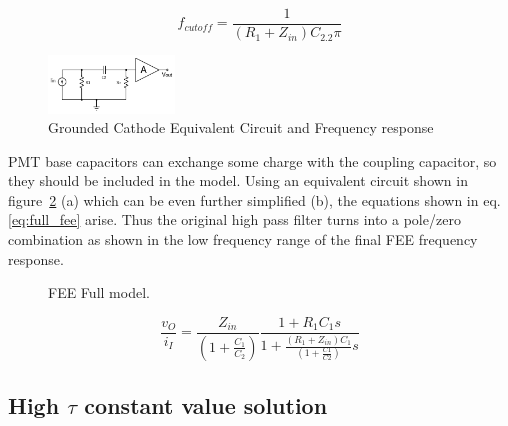 \documentclass[a4paper, 10pt, oneside, twocolumn, 3p]{elsarticle}
\begin{document}
\begin{equation}
f_{cutoff}=\frac{1}{(R_1+Z_{in})C_2.2\pi}
\end{equation}


\begin{figure}
	\begin{center}
		\includegraphics[width=0.3\textwidth]{./figures/FEE_simple.png}
	\end{center}
	\caption{Grounded Cathode Equivalent Circuit and Frequency response}
	\label{fig:GC_equivalent_circuit}
\end{figure}


PMT base capacitors can exchange some charge with the coupling capacitor, so they should be included in the model. Using an equivalent circuit shown in figure~\ref{fig:FEE_PMT} (a) which can be even further simplified (b), the equations shown in eq. \ref{eq:full_fee} arise. Thus the original high pass filter turns into a pole/zero combination as shown in the low frequency range of the final FEE frequency response.

\begin{figure}[!tbp]
	\centering
	\hfill
	\caption{FEE Full model.}
	\label{fig:FEE_PMT}
\end{figure}

\begin{equation}
\frac{v_O}{i_I} = \frac{Z_{in}}{(1+\frac{C_1}{C_2})}\frac{1+R_1C_1s}{1+\frac{(R_1+Z_{in})C_1}{(1+\frac{C1}{C2})}s} 
\label{eq:full_fee}
\end{equation}


\subsection {High $\tau$ constant value solution}
\end{document}
